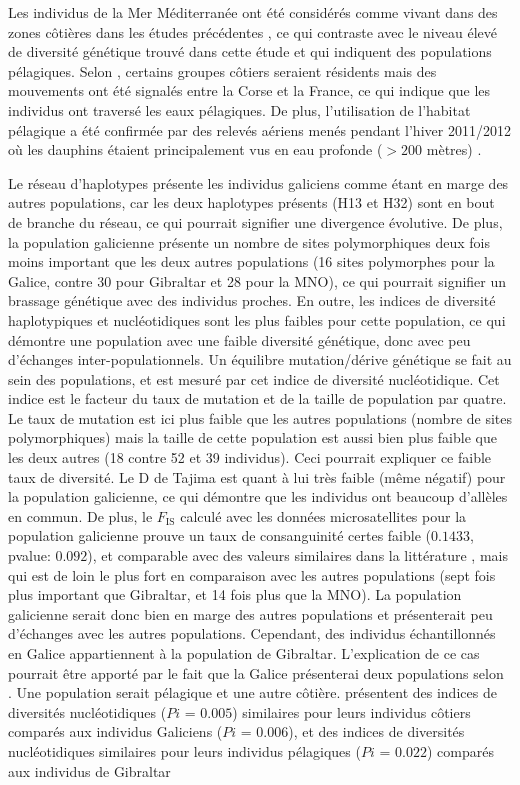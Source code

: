 \documentclass[a4paper,12pt,twoside]{article}\usepackage[]{graphicx}\usepackage[]{color}
\begin{document}
Les individus de la Mer Méditerranée ont été considérés comme vivant dans des zones côtières dans les études précédentes \citep{natoli2004population, natoli2005habitat}, ce qui contraste avec le niveau élevé de diversité génétique trouvé dans cette étude et qui indiquent des populations pélagiques. Selon \citet{gnone2011distribution}, certains groupes côtiers seraient résidents mais des mouvements ont été signalés entre la Corse et la France, ce qui indique que les individus ont traversé les eaux pélagiques. De plus, l'utilisation de l'habitat pélagique a été confirmée par des relevés aériens menés pendant l'hiver 2011/2012 où les dauphins étaient principalement vus en eau profonde ($> 200$ mètres) \citep{louis2014}.

Le réseau d'haplotypes présente les individus galiciens comme étant en marge des autres populations, car les deux haplotypes présents (H13 et H32) sont en bout de branche du réseau, ce qui pourrait signifier une divergence évolutive. De plus, la population galicienne présente un nombre de sites polymorphiques deux fois moins important que les deux autres populations (16 sites polymorphes pour la Galice, contre 30 pour Gibraltar et 28 pour la MNO), ce qui pourrait signifier un brassage génétique avec des individus proches. En outre, les indices de diversité haplotypiques et nucléotidiques sont les plus faibles pour cette population, ce qui démontre une population avec une faible diversité génétique, donc avec peu d'échanges inter-populationnels. Un équilibre mutation/dérive génétique se fait au sein des populations, et est mesuré par cet indice de diversité nucléotidique. Cet indice est le facteur du taux de mutation et de la taille de population par quatre. Le taux de mutation est ici plus faible que les autres populations (nombre de sites polymorphiques) mais la taille de cette population est aussi bien plus faible que les deux autres (18 contre 52 et 39 individus). Ceci pourrait expliquer ce faible taux de diversité. Le D de Tajima est quant à lui très faible (même négatif) pour la population galicienne, ce qui démontre que les individus ont beaucoup d'allèles en commun. De plus, le $F_\textrm{IS}$ calculé avec les données microsatellites pour la population galicienne prouve un taux de consanguinité certes faible ($0.1433$, pvalue: $0.092$), et comparable avec des valeurs similaires dans la littérature \citep{louis2014, phdLouis2014}, mais qui est de loin le plus fort en comparaison avec les autres populations (sept fois plus important que Gibraltar, et 14 fois plus que la MNO). La population galicienne serait donc bien en marge des autres populations et présenterait peu d'échanges avec les autres populations. Cependant, des individus échantillonnés en Galice appartiennent à la population de Gibraltar. L'explication de ce cas pourrait être apporté par le fait que la Galice présenterai deux populations selon \citet{louis2014}. Une population serait pélagique et une autre côtière. \citet{lowther2014} présentent des indices de diversités nucléotidiques ($Pi$ = $0.005$) similaires pour leurs individus côtiers comparés aux individus Galiciens ($Pi$ = $0.006$), et des indices de diversités nucléotidiques similaires pour leurs individus pélagiques ($Pi$ = $0.022$) comparés aux individus de Gibraltar 
\end{document}
